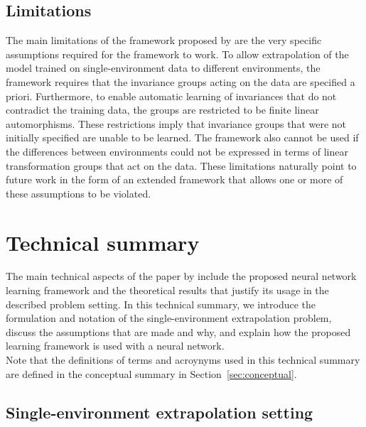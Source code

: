  
\subsection{Limitations}

The main limitations of the framework proposed by \textcite{Mouli:2021} are the very specific assumptions required for the framework to work. To allow extrapolation of the model trained on single-environment data to different environments, the framework requires that the invariance groups acting on the data are specified a priori. Furthermore, to enable automatic learning of invariances that do not contradict the training data, the groups are restricted to be finite linear automorphisms. These restrictions imply that invariance groups that were not initially specified are unable to be learned. The framework also cannot be used if the differences between environments could not be expressed in terms of linear transformation groups that act on the data. These limitations naturally point to future work in the form of an extended framework that allows one or more of these assumptions to be violated.



\newpage



\section{Technical summary}

The main technical aspects of the paper by \textcite{Mouli:2021} include the proposed neural network learning framework and the theoretical results that justify its usage in the described problem setting. In this technical summary, we introduce the formulation and notation of the single-environment extrapolation problem, discuss the assumptions that are made and why, and explain how the proposed learning framework is used with a neural network.
\\

Note that the definitions of terms and acroynyms used in this technical summary are defined in the conceptual summary in Section~\ref{sec:conceptual}.


\subsection{Single-environment extrapolation setting}

